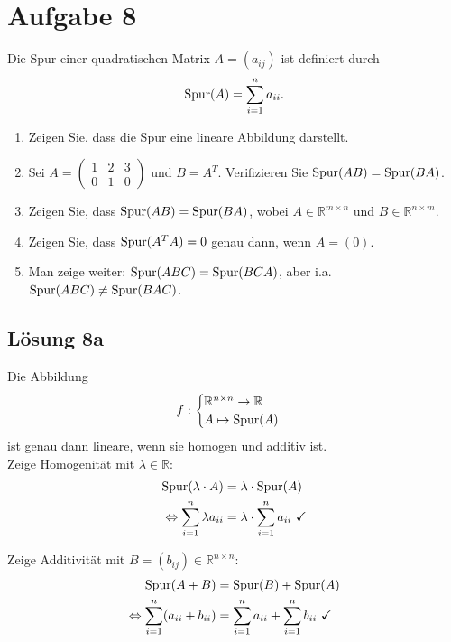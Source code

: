 \documentclass[main.tex]{subfiles}
\begin{document}
\section{Aufgabe 8}
Die Spur einer quadratischen Matrix $A=(a_{ij})$ ist definiert durch
\begin{equation} \label{eq:spur}
    \operatorname{Spur} (A) = \sum_{i=1}^{n} a_{ii}.
\end{equation}

\begin{enumerate}
    \item Zeigen Sie, dass die Spur eine lineare Abbildung darstellt.
    \item Sei $A = \begin{pmatrix}
        1 & 2 & 3 \\
        0 & 1 & 0
    \end{pmatrix}$ und $B = A^T$. Verifizieren Sie $\operatorname{Spur} (AB)= \operatorname{Spur} (BA)$.
    \item Zeigen Sie, dass $\operatorname{Spur} (AB) = \operatorname{Spur} (BA)$, wobei $A \in \mathbb{R}^{m\times n}$ und $B\in \mathbb{R}^{n\times m}$.
    \item Zeigen Sie, dass $\operatorname{Spur} (A^T A) = 0$ genau dann, wenn $A=(0)$.
    \item Man zeige weiter: $\operatorname{Spur} (ABC) = \operatorname{Spur} (BCA)$, aber i.a. $\operatorname{Spur} (ABC) \neq \operatorname{Spur} (BAC)$.
\end{enumerate}

\subsection{Lösung 8a}
Die Abbildung
$$
    f : \begin{cases}
        \mathbb{R}^{n\times n} \to \mathbb{R}\\
        A \mapsto \operatorname{Spur} (A)
    \end{cases}
$$
ist genau dann lineare, wenn sie homogen und additiv ist.\\

Zeige Homogenität mit $\lambda \in \mathbb{R}$:
\begin{equation*}
    \begin{aligned}
                        \operatorname{Spur} (\lambda \cdot A)       & = \lambda \cdot \operatorname{Spur} (A)\\
        \Leftrightarrow \sum_{i=1}^{n} \lambda a_{ii} & = \lambda \cdot \sum_{i=1}^{n} a_{ii}\ \checkmark
    \end{aligned}
\end{equation*}

Zeige Additivität mit $B = (b_{ij}) \in \mathbb{R}^{n\times n}$:
\begin{equation*}
    \begin{aligned}
        \operatorname{Spur} (A + B) & = \operatorname{Spur} (B) + \operatorname{Spur} (A) \\
        \Leftrightarrow \sum_{i=1}^{n} ( a_{ii} + b_{ii} ) & = \sum_{i=1}^{n} a_{ii} + \sum_{i=1}^{n} b_{ii} \ \checkmark
    \end{aligned}
\end{equation*}
\end{document}
